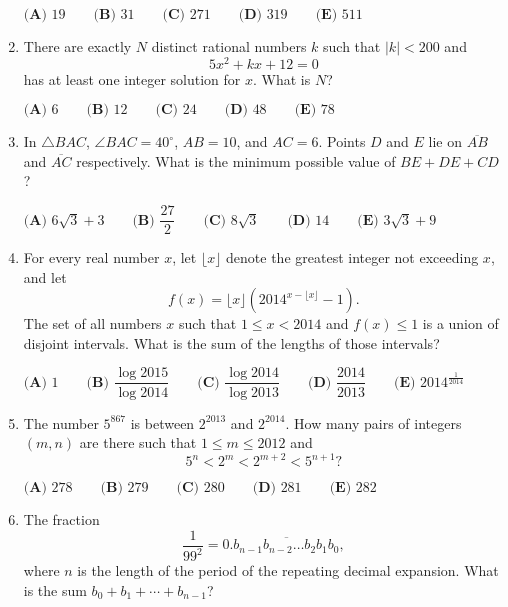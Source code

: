 \documentclass{article}
\begin{document}
\begin{enumerate}[label=\arabic*., itemsep=0.5em]
\(\textbf{(A) }19\qquad
\textbf{(B) }31\qquad
\textbf{(C) }271\qquad
\textbf{(D) }319\qquad
\textbf{(E) }511\qquad\)\par \vspace{0.5em}\item There are exactly \(N\) distinct rational numbers \(k\) such that \(|k|<200\) and 
\begin{equation*}
5x^2+kx+12=0
\end{equation*}
 has at least one integer solution for \(x\).  What is \(N\)?

\(\textbf{(A) }6\qquad
\textbf{(B) }12\qquad
\textbf{(C) }24\qquad
\textbf{(D) }48\qquad
\textbf{(E) }78\qquad\)\par \vspace{0.5em}\item In \(\triangle BAC\), \(\angle BAC=40^\circ\), \(AB=10\), and \(AC=6\).  Points \(D\) and \(E\) lie on \(\overline{AB}\) and \(\overline{AC}\) respectively.  What is the minimum possible value of \(BE+DE+CD\)?

\(\textbf{(A) }6\sqrt 3+3\qquad
\textbf{(B) }\dfrac{27}2\qquad
\textbf{(C) }8\sqrt 3\qquad
\textbf{(D) }14\qquad
\textbf{(E) }3\sqrt 3+9\qquad\)\par \vspace{0.5em}\item For every real number \(x\), let \(\lfloor x\rfloor\) denote the greatest integer not exceeding \(x\), and let 
\begin{equation*}
f(x)=\lfloor x\rfloor(2014^{x-\lfloor x\rfloor}-1).
\end{equation*}
  The set of all numbers \(x\) such that \(1\leq x<2014\) and \(f(x)\leq 1\) is a union of disjoint intervals.  What is the sum of the lengths of those intervals?

\(\textbf{(A) }1\qquad
\textbf{(B) }\dfrac{\log 2015}{\log 2014}\qquad
\textbf{(C) }\dfrac{\log 2014}{\log 2013}\qquad
\textbf{(D) }\dfrac{2014}{2013}\qquad
\textbf{(E) }2014^{\frac1{2014}}\qquad\)\par \vspace{0.5em}\item The number \(5^{867}\) is between \(2^{2013}\) and \(2^{2014}\).  How many pairs of integers \((m,n)\) are there such that \(1\leq m\leq 2012\) and 
\begin{equation*}
5^n<2^m<2^{m+2}<5^{n+1}?
\end{equation*}

\(\textbf{(A) }278\qquad
\textbf{(B) }279\qquad
\textbf{(C) }280\qquad
\textbf{(D) }281\qquad
\textbf{(E) }282\qquad\)\par \vspace{0.5em}\item The fraction 
\begin{equation*}
\dfrac1{99^2}=0.\overline{b_{n-1}b_{n-2}\ldots b_2b_1b_0},
\end{equation*}
 where \(n\) is the length of the period of the repeating decimal expansion.  What is the sum \(b_0+b_1+\cdots+b_{n-1}\)?


\end{enumerate}
\end{document}
